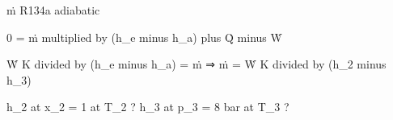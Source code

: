ṁ R134a  
adiabatic  

0 = ṁ multiplied by (h_e minus h_a) plus Q̇ minus Ẇ  

Ẇ K divided by (h_e minus h_a) = ṁ  
⇒ ṁ = Ẇ K divided by (h_2 minus h_3)  

h_2 at x_2 = 1 at T_2 ?  
h_3 at p_3 = 8 bar at T_3 ?